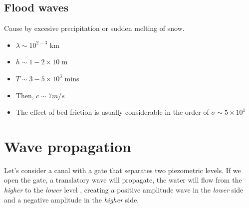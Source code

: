 \documentclass[a4paper, 11pt,article,oneside]{memoir}%
\begin{document}
{\color{magenta}\subsection{Flood waves}}
Cause by excesive precipitation or sudden melting of snow.
\begin{itemize}
\item $\lambda \sim   10^{2-3}$ km
\item $h\sim 1-2\times 10$ m
\item $T\sim 3-5\times 10^3 $ mins
\item Then, $c\sim 7 m/s$
\item The effect of bed friction is usually considerable in the order of $ \sigma \sim 5 \times 10^{1}$
\end{itemize}

{\color{magenta}\section{Wave propagation}}
Let's consider a canal with a gate that separates two piezometric levels. If we open the gate, a translatory wave will propagate, the water will flow from the \textit{higher} to the \textit{lower} level , creating a positive amplitude wave in the \textit{lower} side and a negative amplitude in the \textit{higher} side.
\end{document}
